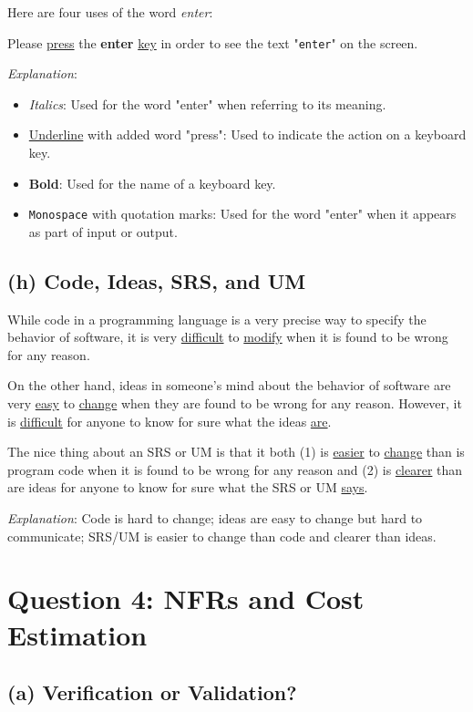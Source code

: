 \documentclass{article}
\begin{document}
Here are four uses of the word \textit{enter}:

Please \underline{press} the \textbf{enter} \underline{key} in order to see the text "\texttt{enter}" on the screen.

\textit{Explanation}:
\begin{itemize}
    \item \textit{Italics}: Used for the word "enter" when referring to its meaning.
    \item \underline{Underline} with added word "press": Used to indicate the action on a keyboard key.
    \item \textbf{Bold}: Used for the name of a keyboard key.
    \item \texttt{Monospace} with quotation marks: Used for the word "enter" when it appears as part of input or output.
\end{itemize}

\subsection*{(h) Code, Ideas, SRS, and UM}

While code in a programming language is a very precise way to specify the behavior of software, it is very \underline{difficult} to \underline{modify} when it is found to be wrong for any reason.

On the other hand, ideas in someone's mind about the behavior of software are very \underline{easy} to \underline{change} when they are found to be wrong for any reason. However, it is \underline{difficult} for anyone to know for sure what the ideas \underline{are}.

The nice thing about an SRS or UM is that it both (1) is \underline{easier} to \underline{change} than is program code when it is found to be wrong for any reason and (2) is \underline{clearer} than are ideas for anyone to know for sure what the SRS or UM \underline{says}.

\textit{Explanation}: Code is hard to change; ideas are easy to change but hard to communicate; SRS/UM is easier to change than code and clearer than ideas.

\section*{Question 4: NFRs and Cost Estimation}

\subsection*{(a) Verification or Validation?}
\end{document}
